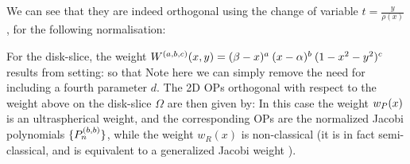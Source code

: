 We can see that they are indeed orthogonal using the change of variable $t = \frac{y}{\rho(x)}$, for the following normalisation:

For the disk-slice, the weight ${W^{(a,b,c)}}(x,y) = (\beta - x)^a \: (x - \alpha)^b \: (1-x^2-y^2)^c$ results from setting:
so that
Note here we can simply remove the need for including a fourth parameter $d$. The 2D OPs orthogonal with respect to the weight above on the disk-slice $\Omega$ are then given by:
In this case the weight $w_P(x)$ is an ultraspherical weight, and the corresponding OPs are the normalized Jacobi polynomials $\{{P}_n^{(b, b)}\}$, while the weight $w_R(x)$ is non-classical (it is in fact semi-classical, and is equivalent to a generalized Jacobi weight \cite[\S5]{magnus1995painleve}).

